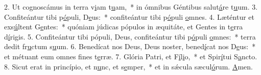 2. Ut cognoscámus in terra v\uline{i}am t\uline{u}am,~* in ómnibus Géntibus salut\uline{á}re t\uline{u}um.
3. Confiteántur tibi p\uline{ó}puli, D\uline{e}us:~* confiteántur tibi p\uline{ó}puli \uline{o}mnes.
4. Læténtur et exs\uline{ú}ltent G\uline{e}ntes:~* quóniam júdicas pópulos in æquitáte, et Gentes in t\uline{e}rra d\uline{í}rigis.
5. Confiteántur tibi pópuli, Deus, confiteántur tibi p\uline{ó}puli \uline{o}mnes:~* terra dedit fr\uline{u}ctum s\uline{u}um.
6. Benedícat nos Deus, Deus noster, bened\uline{í}cat nos D\uline{e}us:~* et métuant eum omnes f\uline{i}nes t\uline{e}rræ.
7. Glória Patri, et F\uline{í}l\uline{i}o,~* et Spir\uline{í}tui S\uline{a}ncto.
8. Sicut erat in princípio, et n\uline{u}nc, et s\uline{e}mper,~* et in sǽcula sæcul\uline{ó}rum. \uline{A}men.
